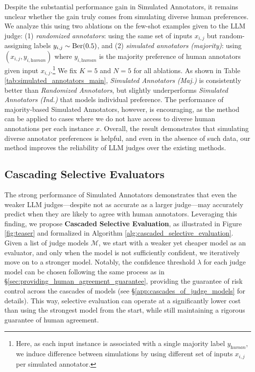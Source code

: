 Despite the substantial performance gain in Simulated Annotators, it remains unclear whether the gain truly comes from simulating diverse human preferences. We analyze this using two ablations on the few-shot examples given to the LLM judge: (1) \textit{randomized annotators}: using the same set of inputs $x_{i, j}$ but random-assigning labels $y_{i, j} \sim \operatorname*{Ber}(0.5)$, and (2) \textit{simulated annotators (majority)}: using $(x_{i,j}, y_{i, \textit{human}})$ where $y_{i, \textit{human}}$ is the majority preference of human annotators given input $x_{i, j}$.\footnote{Here, as each input instance is associated with a single majority label $y_\textit{human}$, we induce difference between simulations by using different set of inputs $x_{i,j}$ per simulated annotator.} We fix $K = 5$ and $N = 5$ for all ablations. As shown in Table \ref{tab:simulated_annotators_main}, \textit{Simulated Annotators (Maj.)} is consistently better than \textit{Randomized Annotators}, but slightly underperforms \textit{Simulated Annotators (Ind.)} that models individual preference. The performance of majority-based Simulated Annotators, however, is encouraging, as the method can be applied to cases where we do not have access to diverse human annotations per each instance $x$. Overall, the result demonstrates that simulating diverse annotator preferences is helpful, and even in the absence of such data, our method improves the reliability of LLM judges over the existing methods.

\subsection{Cascading Selective Evaluators}\label{sec:cascaded_eval}

The strong performance of Simulated Annotators demonstrates that even the weaker LLM judges---despite not as accurate as a larger judge---may accurately predict when they are likely to agree with human annotators. Leveraging this finding, we propose \textbf{Cascaded Selective Evaluation}, as illustrated in Figure \ref{fig:teaser} and formalized in Algorithm \ref{alg:cascaded_selective_evaluation}. Given a list of judge models $\mathcal{M}$,  we start with a weaker yet cheaper model as an evaluator, and only when the model is not sufficiently confident, we iteratively move on to a stronger model. Notably, the confidence threshold $\lambda$ for each judge model can be chosen following the same process as in \S\ref{sec:providing_human_agreement_guarantee}, providing the guarantee of risk control across the cascades of models (see \S \ref{app:cascades_of_judge_models} for details). This way, selective evaluation can operate at a significantly lower cost than using the strongest model from the start, while still maintaining a rigorous guarantee of human agreement.

